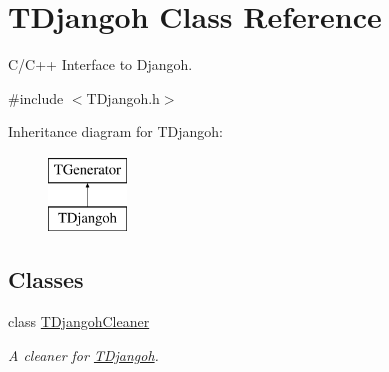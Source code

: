 \hypertarget{class_t_djangoh}{\section{T\+Djangoh Class Reference}
\label{class_t_djangoh}
}


C/\+C++ Interface to Djangoh.  




{\ttfamily \#include $<$T\+Djangoh.\+h$>$}

Inheritance diagram for T\+Djangoh\+:\begin{figure}[H]
\begin{center}
\leavevmode
\includegraphics[height=2.000000cm]{class_t_djangoh}
\end{center}
\end{figure}
\subsection*{Classes}
\begin{DoxyCompactItemize}
\item 
class \hyperlink{class_t_djangoh_1_1_t_djangoh_cleaner}{T\+Djangoh\+Cleaner}
\begin{DoxyCompactList}\small\item\em A cleaner for \hyperlink{class_t_djangoh}{T\+Djangoh}. \end{DoxyCompactList}\end{DoxyCompactItemize}
